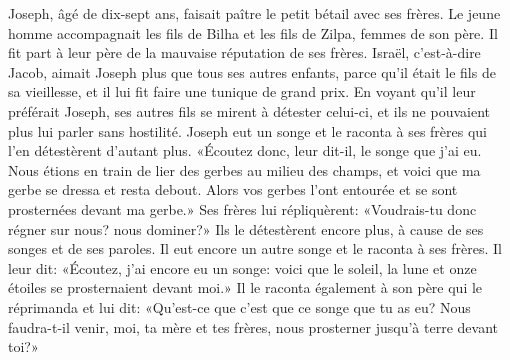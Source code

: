Joseph, âgé de dix-sept ans, faisait paître le petit bétail avec ses frères.
Le jeune homme accompagnait les fils de Bilha et les fils de Zilpa, femmes de son père.
	Il fit part à leur père de la mauvaise réputation de ses frères.
Israël, c’est-à-dire Jacob, aimait Joseph plus que tous ses autres enfants,
	parce qu’il était le fils de sa vieillesse,
	et il lui fit faire une tunique de grand prix.
En voyant qu’il leur préférait Joseph, ses autres fils se mirent à détester celui-ci,
	et ils ne pouvaient plus lui parler sans hostilité.
Joseph eut un songe et le raconta à ses frères qui l’en détestèrent d’autant plus.
«Écoutez donc, leur dit-il, le songe que j’ai eu.
Nous étions en train de lier des gerbes au milieu des champs,
	et voici que ma gerbe se dressa et resta debout.
Alors vos gerbes l’ont entourée et se sont prosternées devant ma gerbe.»
Ses frères lui répliquèrent:
	«Voudrais-tu donc régner sur nous? nous dominer?»
Ils le détestèrent encore plus, à cause de ses songes et de ses paroles.
Il eut encore un autre songe et le raconta à ses frères.
Il leur dit: «Écoutez, j’ai encore eu un songe:
	voici que le soleil, la lune et onze étoiles se prosternaient devant moi.»
Il le raconta également à son père qui le réprimanda et lui dit:
	«Qu’est-ce que c’est que ce songe que tu as eu?
	Nous faudra-t-il venir, moi, ta mère et tes frères,
	nous prosterner jusqu’à terre devant toi?»
